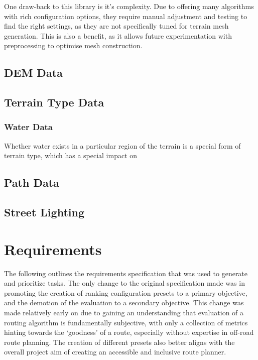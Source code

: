 \documentclass[12pt]{article}
\begin{document}
One draw-back to this library is it's complexity. Due to offering many algorithms with rich configuration options, they require manual adjustment and testing to find the right settings, as they are not specifically tuned for terrain mesh generation. This is also a benefit, as it allows future experimentation with preprocessing to optimise mesh construction.

\subsection{DEM Data}

\subsection{Terrain Type Data}

\subsubsection{Water Data}

Whether water exists in a particular region of the terrain is a special form of terrain type, which has a special impact on

\subsection{Path Data}


\subsection{Street Lighting}

\section{Requirements}

The following outlines the requirements specification that was used to generate and prioritize tasks. The only change to the original specification made was in promoting the creation of ranking configuration presets to a primary objective, and the demotion of the evaluation to a secondary objective. This change was made relatively early on due to gaining an understanding that evaluation of a routing algorithm is fundamentally subjective, with only a collection of metrics hinting towards the `goodness' of a route, especially without expertise in off-road route planning. The creation of different presets also better aligns with the overall project aim of creating an accessible and inclusive route planner.
\end{document}
